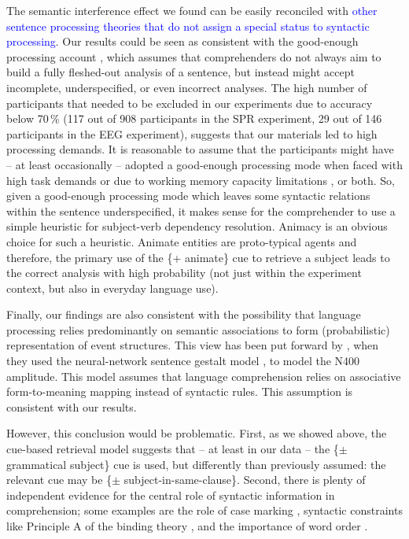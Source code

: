 \documentclass[review,preprint,12pt,authoryear,floatsintext]{elsarticle}
\begin{document}
{{{The semantic interference effect we found can be easily reconciled with \textcolor{blue}{other sentence processing theories that do not assign a special status to syntactic processing}. Our results could be seen as consistent with the good-enough processing account \citep{ferreira2007goodenough}, which assumes that comprehenders do not always aim to build a fully fleshed-out analysis of a sentence, but instead might accept incomplete, underspecified, or even incorrect analyses. The high number of participants that needed to be excluded in our experiments due to accuracy below 70\,\% (117 out of 908 participants in the SPR experiment, 29 out of 146 participants in the EEG experiment), suggests that our materials led to high processing demands. It is reasonable to assume that the participants might have -- at least occasionally -- adopted a good-enough processing mode when faced with high task demands \citep{swets2008underspecification,LogacevMultiple,LogacevVasishthQJEP2016} or due to working memory capacity limitations \citep{MalsburgVasishth2013}, or both. So, given a good-enough processing mode which leaves some syntactic relations within the sentence underspecified, it makes sense for the comprehender to use a simple heuristic for subject-verb dependency resolution. Animacy is an obvious choice for such a heuristic. Animate entities are proto-typical agents \citep{dowty1991thematic} and therefore, the primary use of the \{+ animate\} cue to retrieve a subject leads to the correct analysis with high probability (not just within the experiment context, but also in everyday language use). 
 
Finally, our findings are also consistent with the possibility that language processing relies predominantly on semantic associations to form (probabilistic)
representation of event structures. This view has been put forward by \cite{rabovsky_etal_2018}, when they used the neural-network sentence gestalt model \citep{mcclelland1989_sentence_gestalt}, to model the N400 amplitude. This model assumes that language comprehension relies on associative form-to-meaning mapping instead of syntactic rules. This assumption is consistent with our results.}

\label{thisdesign2} However, this conclusion would be problematic. First, as we showed above, the cue-based retrieval model suggests that -- at least in our data -- the \{$\pm$ grammatical subject\} cue is used, but differently than previously assumed: the relevant cue may be \{$\pm$ subject-in-same-clause\}. Second, there is plenty of independent evidence for the central role of syntactic information in comprehension; some examples are the role of case marking \citep[e.g.,][]{Avetisyan_etal_2020_agree,HusainEtAl2014,bhatia2022processing,bader2000case,bader2006case,miyamoto2002case}, syntactic constraints like Principle A of the binding theory \citep[e.g.,][]{Sturt2003,dillon2013,yadav2021individual},  and 
the importance of word order \citep[e.g.,][]{meng2000mode}. 

}}
\end{document}
